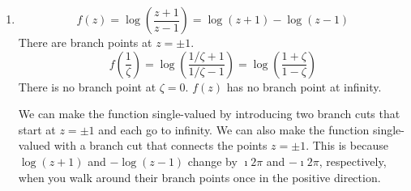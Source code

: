 {\begin{Solution}
\begin{enumerate}
    We can make the function single-valued by introducing two branch cuts that
    start at $z = \pm 1$ and each go to infinity.
  \item
    \[
    f(z) = \log \left( \frac{z+1}{z-1} \right)
    = \log (z+1) - \log (z-1)
    \]
    There are branch points at $z = \pm 1$.
    \[
    f \left( \frac{1}{\zeta} \right)
    = \log \left( \frac{1/\zeta + 1}{1/\zeta - 1} \right)
    = \log \left( \frac{1 + \zeta}{1 - \zeta} \right)
    \]
    There is no branch point at $\zeta = 0$.  $f(z)$ has no branch point at
    infinity.

    We can make the function single-valued by introducing two branch cuts that
    start at $z = \pm 1$ and each go to infinity.  We can also make the function
    single-valued with a branch cut that connects the points $z = \pm 1$.
    This is because $\log(z+1)$ and $-\log(z-1)$ change by $\imath 2 \pi$ and
    $- \imath 2 \pi$, respectively, when you walk around their branch points once
    in the positive direction.
  \end{enumerate}
\end{Solution}
}













